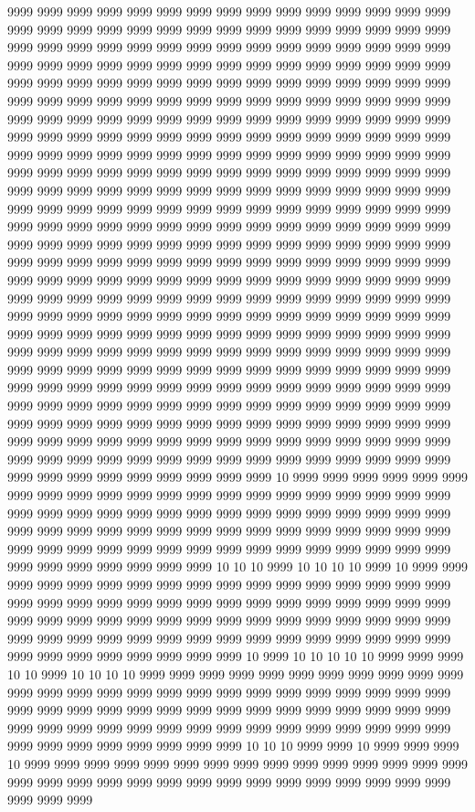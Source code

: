 9999 9999 9999 9999 9999 9999 9999 9999 9999 9999 9999 9999 9999 9999 9999 9999 9999 9999 9999 9999 9999 9999 9999 9999 9999 9999 9999 9999 9999 9999 9999 9999 9999 9999 9999 9999 9999 9999 9999 9999 9999 9999 9999 9999 9999 9999 9999 9999 9999 9999 9999 9999 9999 9999 9999 9999 9999 9999 9999 9999 9999 9999 9999 9999 9999 9999 9999 9999 9999 9999 9999 9999 9999 9999 9999 9999 9999 9999 9999 9999 9999 9999 9999 9999 9999 9999 9999 9999 9999 9999 9999 9999 9999 9999 9999 9999 9999 9999 9999 9999 9999 9999 9999 9999 9999 9999 9999 9999 9999 9999 9999 9999 9999 9999 9999 9999 9999 9999 9999 9999 9999 9999 9999 9999 9999 9999 9999 9999 9999 9999 9999 9999 9999 9999 9999 9999 9999 9999 9999 9999 9999 9999 9999 9999 9999 9999 9999 9999 9999 9999 9999 9999 9999 9999 9999 9999 9999 9999 9999 9999 9999 9999 9999 9999 9999 9999 9999 9999 9999 9999 9999 9999 9999 9999 9999 9999 9999 9999 9999 9999 9999 9999 9999 9999 9999 9999 9999 9999 9999 9999 9999 9999 9999 9999 9999 9999 9999 9999 9999 9999 9999 9999 9999 9999 9999 9999 9999 9999 9999 9999 9999 9999 9999 9999 9999 9999 9999 9999 9999 9999 9999 9999 9999 9999 9999 9999 9999 9999 9999 9999 9999 9999 9999 9999 9999 9999 9999 9999 9999 9999 9999 9999 9999 9999 9999 9999 9999 9999 9999 9999 9999 9999 9999 9999 9999 9999 9999 9999 9999 9999 9999 9999 9999 9999 9999 9999 9999 9999 9999 9999 9999 9999 9999 9999 9999 9999 9999 9999 9999 9999 9999 9999 9999 9999 9999 9999 9999 9999 9999 9999 9999 9999 9999 9999 9999 9999 9999 9999 9999 9999 9999 9999 9999 9999 9999 9999 9999 9999 9999 9999 9999 9999 9999 9999 9999 9999 9999 9999 9999 9999 9999 9999 9999 9999 9999 9999 9999 9999 9999 9999 9999 9999 9999 9999 9999 9999 9999 9999 9999 9999 9999 9999 9999 9999 9999 9999 9999 9999 9999 9999 9999 9999 9999 9999 9999 9999 9999 9999 9999 9999 9999 9999 9999 9999 9999 9999 9999 9999 9999 9999 9999 9999 9999 9999 9999 9999 9999 9999 9999 9999 9999 9999 9999 9999 9999 9999 9999 9999 9999 9999 9999 9999 9999 9999 9999 9999 9999 9999 9999 10 9999 9999 9999 9999 9999 9999 9999 9999 9999 9999 9999 9999 9999 9999 9999 9999 9999 9999 9999 9999 9999 9999 9999 9999 9999 9999 9999 9999 9999 9999 9999 9999 9999 9999 9999 9999 9999 9999 9999 9999 9999 9999 9999 9999 9999 9999 9999 9999 9999 9999 9999 9999 9999 9999 9999 9999 9999 9999 9999 9999 9999 9999 9999 9999 9999 9999 9999 9999 9999 9999 9999 9999 9999 10 10 10 9999 10 10 10 10 9999 10 9999 9999 9999 9999 9999 9999 9999 9999 9999 9999 9999 9999 9999 9999 9999 9999 9999 9999 9999 9999 9999 9999 9999 9999 9999 9999 9999 9999 9999 9999 9999 9999 9999 9999 9999 9999 9999 9999 9999 9999 9999 9999 9999 9999 9999 9999 9999 9999 9999 9999 9999 9999 9999 9999 9999 9999 9999 9999 9999 9999 9999 9999 9999 9999 9999 9999 9999 9999 9999 9999 10 9999 10 10 10 10 10 9999 9999 9999 10 10 9999 10 10 10 10 9999 9999 9999 9999 9999 9999 9999 9999 9999 9999 9999 9999 9999 9999 9999 9999 9999 9999 9999 9999 9999 9999 9999 9999 9999 9999 9999 9999 9999 9999 9999 9999 9999 9999 9999 9999 9999 9999 9999 9999 9999 9999 9999 9999 9999 9999 9999 9999 9999 9999 9999 9999 9999 9999 9999 9999 9999 9999 9999 9999 9999 9999 9999 9999 10 10 10 9999 9999 10 9999 9999 9999 10 9999 9999 9999 9999 9999 9999 9999 9999 9999 9999 9999 9999 9999 9999 9999 9999 9999 9999 9999 9999 9999 9999 9999 9999 9999 9999 9999 9999 9999 9999 9999 9999 9999 